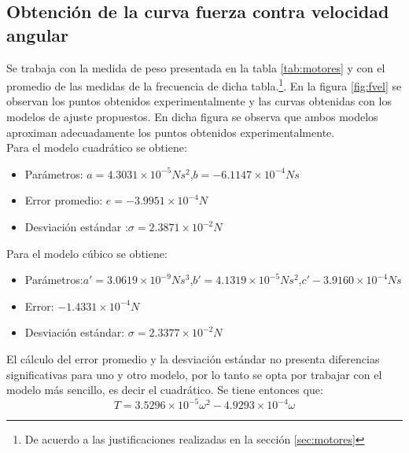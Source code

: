 \documentclass[main]{subfiles}
\begin{document}
\subsection{Obtenci\'on de la curva fuerza contra velocidad angular}

Se trabaja con la medida de peso presentada en la tabla \ref{tab:motores} y con el promedio de las medidas de la frecuencia de dicha tabla.\footnote{De acuerdo a las justificaciones realizadas en la secci\'on \ref{sec:motores}}. En la figura \ref{fig:fvel} se observan los puntos obtenidos experimentalmente y las curvas obtenidas con los modelos de ajuste propuestos. En dicha figura se observa que ambos modelos aproximan adecuadamente los puntos obtenidos experimentalmente.\\

Para el modelo cuadr\'atico se obtiene:
\begin{itemize}
\item Par\'ametros: \newline$a=4.3031\times10^{-5}Ns^2$,\newline$b=-6.1147\times 10^{-4}Ns$
\item Error promedio: $e=-3.9951\times 10 ^{-4}N$
\item Desviaci\'on est\'andar :$\sigma=2.3871\times10^{-2}N$
\end{itemize}

Para el modelo c\'ubico se obtiene:
\begin{itemize}
\item Par\'ametros:\newline$a\prime = 3.0619\times 10^{-9}Ns^3$,\newline$b\prime =4.1319\times10^{-5}Ns^2$,\newline$c\prime -3.9160\times10^{-4}Ns$
\item Error: $-1.4331\times10^{-4}N$
\item Desviaci\'on est\'andar: $\sigma=2.3377\times 10^{-2}N$
\end{itemize}

El c\'alculo del error promedio y la desviaci\'on est\'andar no presenta diferencias significativas para uno y otro modelo, por lo tanto se opta por trabajar con el modelo m\'as sencillo, es decir el cuadr\'atico. Se tiene entonces que:
\begin{equation}
T=3.5296\times10^{-5}\omega^2-4.9293\times10^{-4}\omega
\end{equation}
\end{document}

